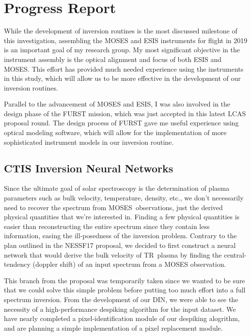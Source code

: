 \documentclass[10pt,letterpaper]{article}
\newcommand{\TR}{\ac{TR}}
\newcommand{\MOSES}{\ac{MOSES}}
\newcommand{\DIN}{\ac{DIN}}
\begin{document}
	
	\section{Progress Report}
	
		While the development of inversion routines is the most discussed milestone of this investigation, assembling the MOSES and ESIS instruments for flight in 2019 is an important goal of my research group.
		My most significant objective in the instrument assembly is the optical alignment and focus of both ESIS and MOSES. 
		This effort has provided much needed experience using the instruments in this study, which will allow us to be more effective in the development of our inversion routines.
		
		Parallel to the advancement of MOSES and ESIS, I was also involved in the design phase of the FURST mission, which was just accepted in this latest LCAS proposal round.
		The design process of FURST gave me useful experience using optical modeling software, which will allow for the implementation of more sophisticated instrument models in our inversion routine.
	
		\subsection{CTIS Inversion Neural Networks}
		
			Since the ultimate goal of solar spectroscopy is the determination of plasma parameters such as bulk velocity, temperature, density, etc., we don't necessarily need to recover the spectrum from \MOSES\ observations, just the derived physical quantities that we're interested in. 
			Finding a few physical quantities is easier than reconstructing the entire spectrum since they contain less information, easing the ill-posedness of the inversion problem.
			Contrary to the plan outlined in the NESSF17 proposal, we decided to first construct a neural network that would derive the bulk velocity of \TR\ plasma by finding the central-tendency (doppler shift) of an input spectrum from a MOSES observation.

			This branch from the proposal was temporarily taken since we wanted to be sure that we could solve this simple problem before putting too much effort into a full spectrum inversion.
			From the development of our \DIN, we were able to see the necessity of a high-performance despiking algorithm for the input dataset.
			We have nearly completed a pixel-identification module of our despiking alogrithm, and are planning a simple implementation of a pixel replacement module.
				
\end{document}
